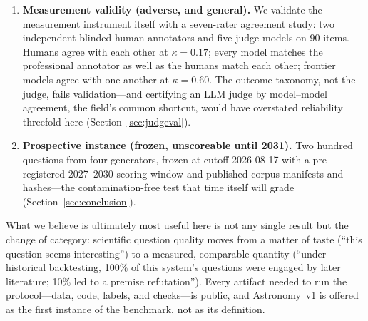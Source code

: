 \begin{enumerate}
    protocol can tell us, eventually, whether it can, and that it
    already discriminates between generator families.
  \item \textbf{Measurement validity (adverse, and general).} We
    validate the measurement instrument itself with a seven-rater
    agreement study: two independent blinded human annotators and five
    judge models on 90 items. Humans agree with each other at
    $\kappa=0.17$; every model matches the professional annotator as
    well as the humans match each other; frontier models agree with one
    another at $\kappa=0.60$. The outcome taxonomy, not the judge,
    fails validation---and certifying an LLM judge by model--model
    agreement, the field's common shortcut, would have overstated
    reliability threefold here (Section~\ref{sec:judgeval}).
  \item \textbf{Prospective instance (frozen, unscoreable until 2031).}
    Two hundred questions from four generators, frozen at cutoff
    2026-08-17 with a pre-registered 2027--2030 scoring window and
    published corpus manifests and hashes---the contamination-free test
    that time itself will grade (Section~\ref{sec:conclusion}).
\end{enumerate}

What we believe is ultimately most useful here is not any single
result but the change of category: scientific question quality moves
from a matter of taste (``this question seems interesting'') to a
measured, comparable quantity (``under historical backtesting, 100\% of
this system's questions were engaged by later literature; 10\% led to a
premise refutation''). Every artifact needed to run the protocol---data,
code, labels, and checks---is public, and Astronomy~v1 is offered as the
first instance of the benchmark, not as its definition.
